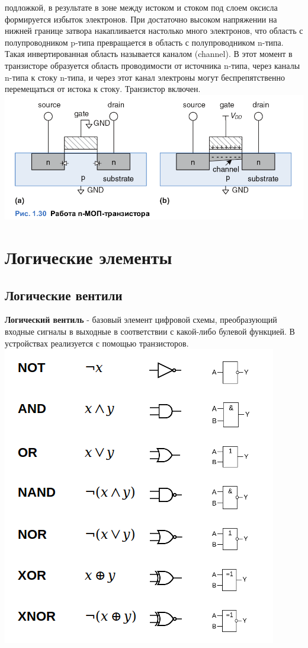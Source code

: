 \documentclass[12pt, a4paper]{article}
\begin{document}
подложкой, в результате в зоне между истоком и стоком под слоем
оксисла формируется избыток электронов. При достаточно высоком
напряжении на нижней границе затвора накапливается настолько много
электронов, что область с полупроводником p-типа превращается в
область с полупроводником n-типа. Такая инвертированная область
называется каналом (channel). В этот момент в транзисторе образуется
область проводимости от источника n-типа, через каналы n-типа к стоку
n-типа, и через этот канал электроны могут беспрепятственно
перемещаться от истока к стоку. Транзистор включен.\\
\includegraphics[scale=0.5]{./images/1_30.png}
\section{Логические элементы}
\subsection{Логические вентили}
\textbf{Логический вентиль} - базовый элемент цифровой схемы, преобразующий входные сигналы в выходные в соответствии с какой-либо булевой функцией. В устройствах реализуется с помощью транзисторов.\\
\includegraphics[scale=0.4]{./images/logicGates.png}
\end{document}
